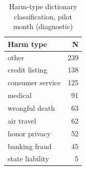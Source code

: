 \begin{table}[t]\centering\caption{Harm-type dictionary classification, pilot month (diagnostic)}\label{tab:pilot_harm}
\begin{tabular}{lr}\toprule Harm type & N \\ \midrule
other & 239 \\
credit listing & 138 \\
consumer service & 125 \\
medical & 91 \\
wrongful death & 63 \\
air travel & 62 \\
honor privacy & 52 \\
banking fraud & 45 \\
state liability & 5 \\
\bottomrule\end{tabular}\end{table}
